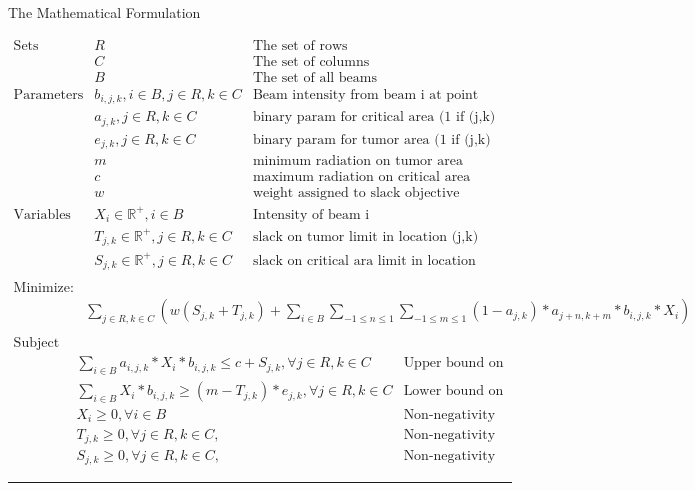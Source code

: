 \documentclass[12pt]{article}
\makeatletter
\newenvironment{task}{\@startsection
       {section}{1}
       {0.4em}{-.5ex plus -1ex minus -.2ex}{.5ex plus .2ex}
       {\pagebreak[3]\large\bf\noindent{Task}}}
       {\nopagebreak[3]\vspace{3ex}\begin{center}\rule{1\linewidth}{.3pt}\end{center}}
\makeatother
\begin{document}
\begin{task}{The Mathematical Formulation}
\begin{enumerate}
\begin{eqnarray*}  
 \textrm{Sets} &  R & \textrm{The set of rows} \\
			& C & \textrm{The set of columns}\\ 
			& B & \textrm{The set of all beams} \\
 \textrm{Parameters} & b_{i,j,k}, i \in B, j \in R, k \in C   & \textrm{Beam intensity from beam i at point (j,k)} \\
& a_{j,k}, j \in R, k \in C   & \textrm{binary param for critical area (1 if (j,k) in critical area)} \\ 
& e_{j,k}, j \in R, k \in C   & \textrm{binary param for tumor area (1 if (j,k) in tumor area)} \\ 
& m & \textrm{minimum radiation on tumor area} \\
& c & \textrm{maximum radiation on critical area} \\
& w & \textrm{weight assigned to slack objective} \\
\textrm{Variables} 
& X_{i} \in \mathbb{R}^+, i \in B & \textrm{Intensity of beam i} \\
& T_{j,k} \in \mathbb{R}^+, j \in R, k \in C & \textrm{slack on tumor limit in location (j,k)} \\
& S_{j,k} \in \mathbb{R}^+, j \in R, k \in C & \textrm{slack on critical ara limit in location (j,k)} \\
\end{eqnarray*}
\begin{eqnarray*} 
\textrm{Minimize:} \\
& \sum_{j \in R, k \in C} (w(S_{j,k} + T_{j,k}) + \sum_{i \in B} \sum_{-1 \leq n \leq 1} \sum_{-1 \leq m \leq 1} (1-a_{j,k}) * a_{j+n, k+m} * b_{i,j,k} * X_{i})\\ 
\end{eqnarray*}
\begin{eqnarray*}
\textrm{Subject to:}\\
& \sum_{i \in B} a_{i,j,k} * X_{i} * b_{i,j,k} \leq c + S_{j,k}, \forall j \in R, k \in C & \textrm {Upper bound on C.A. radiation} \\
& \sum_{i \in B} X_{i} * b_{i,j,k} \geq (m - T_{j,k}) * e_{j,k}, \forall j \in R, k \in C & \textrm {Lower bound on tumor radiation} \\
& X_{i} \geq 0, \forall i \in B & \textrm{Non-negativity constraint} \\
& T_{j,k} \geq 0, \forall j \in R, k \in C, & \textrm{Non-negativity slack constraint}  \\
& S_{j,k} \geq 0, \forall j \in R, k \in C, & \textrm{Non-negativity slack constraint} 
\end{eqnarray*}


\end{enumerate}
\end{task}
\end{document}

